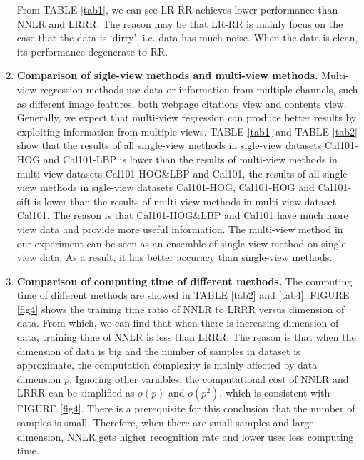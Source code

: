 \documentclass{ieeeaccess}
\begin{document}
\begin{enumerate}
      From TABLE \ref{tab1}, we can see LR-RR achieves lower performance than NNLR and LRRR. The reason may be that LR-RR is mainly focus on the case that the data is `dirty', i.e. data has much noise. When the data is clean, its performance degenerate to RR.
  \item \textbf{Comparison of sigle-view methods and multi-view methods.} Multi-view regression methods use data or information from multiple channels, such as different image features, both webpage citations view and contents view. Generally, we expect
that multi-view regression can produce better results by exploiting information from multiple views. TABLE \ref{tab1} and TABLE \ref{tab2} show that the results of all single-view methods in sigle-view datasets Cal101-HOG and Cal101-LBP is lower than the results of multi-view methods in multi-view datasets Cal101-HOG\&LBP and Cal101, the results of all single-view methods in sigle-view datasets Cal101-HOG, Cal101-HOG and Cal101-sift is lower than the results of multi-view methods in multi-view dataset Cal101. The reason is that Cal101-HOG\&LBP and Cal101 have much more view data and provide more useful information. The multi-view method in our experiment can be seen as an ensemble of single-view method on single-view data. As a result, it has better accuracy than single-view methods.
  \item \textbf{Comparison of computing time of different methods.} The computing time of different methods are showed in TABLE \ref{tab2} and \ref{tab4}. FIGURE \ref{fig4} shows the training time ratio of NNLR to LRRR versus dimension of data. From which, we can find that when there is increasing dimension of data, training time of NNLR is less than LRRR. The reason is that when the dimension of data is big and the number of samples in dataset is approximate, the computation complexity is mainly affected by data dimension $p$. Ignoring other variables, the computational cost of NNLR and LRRR can be simplified as $o(p)$ and $o({p^2})$, which is consistent with FIGURE \ref{fig4}. There is a prerequisite for this conclusion that the number of samples is small. Therefore, when there are small samples and large dimension, NNLR gets higher recognition rate and lower uses less computing time.
\end{enumerate}
\end{document}
